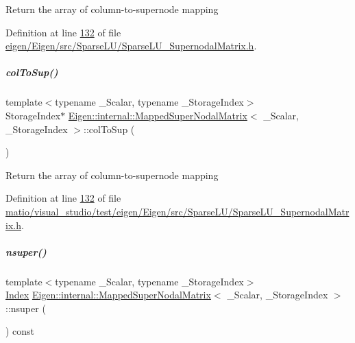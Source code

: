 Return the array of column-\/to-\/supernode mapping 

Definition at line \hyperlink{eigen_2_eigen_2src_2_sparse_l_u_2_sparse_l_u___supernodal_matrix_8h_source_l00132}{132} of file \hyperlink{eigen_2_eigen_2src_2_sparse_l_u_2_sparse_l_u___supernodal_matrix_8h_source}{eigen/\+Eigen/src/\+Sparse\+L\+U/\+Sparse\+L\+U\+\_\+\+Supernodal\+Matrix.\+h}.

\mbox{\label{group___sparse_l_u___module_a1e2c012b63809715188aa7f0c722868d}} 
\subparagraph{\texorpdfstring{col\+To\+Sup()}{colToSup()}\hspace{0.1cm}{\footnotesize\ttfamily [2/2]}}
{\footnotesize\ttfamily template$<$typename \+\_\+\+Scalar, typename \+\_\+\+Storage\+Index$>$ \\
Storage\+Index$\ast$ \hyperlink{group___sparse_l_u___module_class_eigen_1_1internal_1_1_mapped_super_nodal_matrix}{Eigen\+::internal\+::\+Mapped\+Super\+Nodal\+Matrix}$<$ \+\_\+\+Scalar, \+\_\+\+Storage\+Index $>$\+::col\+To\+Sup (\begin{DoxyParamCaption}{ }\end{DoxyParamCaption})\hspace{0.3cm}{\ttfamily [inline]}}

Return the array of column-\/to-\/supernode mapping 

Definition at line \hyperlink{matio_2visual__studio_2test_2eigen_2_eigen_2src_2_sparse_l_u_2_sparse_l_u___supernodal_matrix_8h_source_l00132}{132} of file \hyperlink{matio_2visual__studio_2test_2eigen_2_eigen_2src_2_sparse_l_u_2_sparse_l_u___supernodal_matrix_8h_source}{matio/visual\+\_\+studio/test/eigen/\+Eigen/src/\+Sparse\+L\+U/\+Sparse\+L\+U\+\_\+\+Supernodal\+Matrix.\+h}.

\mbox{\label{group___sparse_l_u___module_a9c0b29102914a6ef9cfd6280fa016fa8}} 
\subparagraph{\texorpdfstring{nsuper()}{nsuper()}\hspace{0.1cm}{\footnotesize\ttfamily [1/2]}}
{\footnotesize\ttfamily template$<$typename \+\_\+\+Scalar, typename \+\_\+\+Storage\+Index$>$ \\
\hyperlink{namespace_eigen_a62e77e0933482dafde8fe197d9a2cfde}{Index} \hyperlink{group___sparse_l_u___module_class_eigen_1_1internal_1_1_mapped_super_nodal_matrix}{Eigen\+::internal\+::\+Mapped\+Super\+Nodal\+Matrix}$<$ \+\_\+\+Scalar, \+\_\+\+Storage\+Index $>$\+::nsuper (\begin{DoxyParamCaption}{ }\end{DoxyParamCaption}) const\hspace{0.3cm}{\ttfamily [inline]}}

